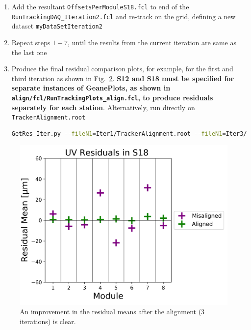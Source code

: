 \documentclass[12pt]{article}
\begin{document}
\begin{enumerate}
\begin{figure}[ht!]
        \caption{The alignment results with $10^5$ tracks after 2 iterations. The alignment stability is not yet reached, as seen by the alignment results from the previous iteration (shown in black) and current iteration (purple) not converged.}
        \label{fig:Align_Data}
    \end{figure}
     \item Add the resultant \verb!OffsetsPerModuleS18.fcl! to end of the \\ \verb!RunTrackingDAQ_Iteration2.fcl! and re-track on the grid, defining a new dataset \texttt{myDataSetIteration2}
     \item Repeat steps $1-7$, until the results from the current iteration are same as the last one
      \item Produce the final residual comparison plots, for example, for the first and third iteration as shown in Fig.~\ref{fig:Res_Data}. \textbf{S12 and S18 must be specified for separate instances of GeanePlots, as shown in \small{\texttt{align/fcl/RunTrackingPlots\_align.fcl}}, to produce residuals separately for each station}. Alternatively, run directly on \verb!TrackerAlignment.root!
     \begin{lstlisting}[language=bash] 
     GetRes_Iter.py --fileN1=Iter1/TrackerAlignment.root --fileN1=Iter3/TrackerAlignment.root \end{lstlisting}
     \end{enumerate}
     \vspace{-0.5cm}
     \begin{figure}[ht]
    \centering
    \includegraphics[width = 0.5\linewidth]{fig/Res_Data.png}
    \vspace{-0.2cm}
    \caption{An improvement in the residual means after the alignment (3 iterations) is clear.}
    \label{fig:Res_Data}
    \end{figure}
\end{document}
